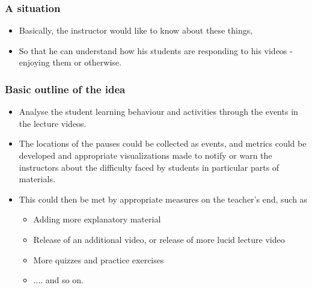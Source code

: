 \documentclass[12pt,xcolor=dvipsnames]{beamer}
\begin{document}
\begin{frame}[t]
\frametitle{A situation}

\begin{itemize}
\vfill
\item Basically, the instructor would like to know about these things,
\item So that he can understand how his students are responding to his videos - enjoying them or otherwise.
\end{itemize}

\end{frame}


\begin{frame}[t]
\frametitle{Basic outline of the idea}

\begin{itemize}
\item Analyse the student learning behaviour and activities through the events in the lecture videos.
\item The locations of the pauses could be collected as events, and metrics could be developed and appropriate visualizations made to notify or warn the instructors about the difficulty faced by students in particular parts of materials.
\item This could then be met by appropriate measures on the teacher's end, such as

\begin{itemize}
\item Adding more explanatory material
\item Release of an additional video, or release of more lucid lecture video
\item More quizzes and practice exercises
\item .... and so on.
\end{itemize}

\end{itemize}
\end{frame}


\end{document}
